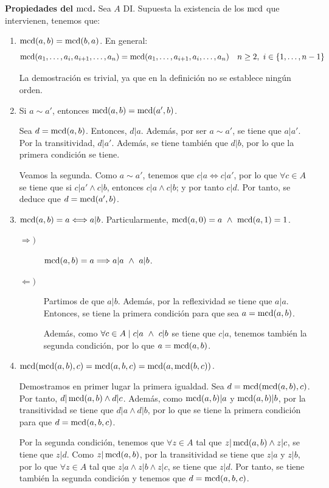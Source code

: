 \textbf{Propiedades del $\operatorname{mcd}$.} Sea $A$ DI. Supuesta la existencia de los $\operatorname{mcd}$ que intervienen, tenemos que:
\begin{enumerate}
    \item $\operatorname{mcd}(a,b) = \operatorname{mcd}(b,a)$.
    En general: $$\operatorname{mcd}(a_1, \ldots, a_i, a_{i+1}, \ldots, a_n) = \operatorname{mcd}(a_1, \ldots, a_{i+1}, a_i, \ldots, a_n)~~~n\geq2,~i \in \{1, \ldots, n-1\}$$

    La demostración es trivial, ya que en la definición no se establece ningún orden.

    \item Si $a\sim a'$, entonces $\operatorname{mcd}(a,b)=\operatorname{mcd}(a',b)$.

    Sea $d = \operatorname{mcd}(a,b)$. Entonces, $d|a$. Además, por ser $a\sim a'$, se tiene que $a|a'$. Por la transitividad, $d|a'$. Además, se tiene también que $d|b$, por lo que la primera condición se tiene.

    Veamos la segunda. Como $a\sim a'$, tenemos que $c|a\Longleftrightarrow c|a'$, por lo que $\forall c\in A$ se tiene que si $c|a'\land c|b$, entonces $c|a\land c|b$; y por tanto $c|d$. Por tanto, se deduce que 
    $d=\operatorname{mcd}(a',b)$.

    \item $\operatorname{mcd}(a,b)=a \Longleftrightarrow a|b$. Particularmente, $\operatorname{mcd}(a,0) = a \ \land \  \operatorname{mcd}(a,1)=1$.
    \begin{description}
        \item[$\Longrightarrow)$] $\operatorname{mcd}(a,b) = a \Longrightarrow a|a \ \land \  a|b$.

        \item[$\Longleftarrow)$] Partimos de que $a|b$. Además, por la reflexividad se tiene que $a|a$. Entonces, se tiene la primera condición para que sea $a=\operatorname{mcd}(a,b)$.

        Además, como $\forall c \in A \mid c|a \ \land \  c|b$ se tiene que $c|a$, tenemos también la segunda condición, por lo que $a=\operatorname{mcd}(a,b)$.
    \end{description}


    \item $\operatorname{mcd}(\operatorname{mcd}(a,b),c) = \operatorname{mcd}(a,b,c) = \operatorname{mcd}(a, \operatorname{mcd}(b,c))$.

    Demostramos en primer lugar la primera igualdad. Sea $d=\operatorname{mcd}(\operatorname{mcd}(a,b),c)$. Por tanto, $d|\operatorname{mcd}(a,b)\land d|c$. Además, como $\operatorname{mcd}(a,b)|a$ y $\operatorname{mcd}(a,b)|b$, por la transitividad se tiene que $d|a\land d|b$, por lo que se tiene la primera condición para que $d=\operatorname{mcd}(a,b,c)$.

    Por la segunda condición, tenemos que $\forall z\in A$ tal que $z|\operatorname{mcd}(a,b)\land z|c$, se tiene que $z|d$. Como $z|\operatorname{mcd}(a,b)$, por la transitividad se tiene que $z|a$ y $z|b$, por lo que $\forall z\in A$ tal que $z|a\land z|b \land z|c$, se tiene que $z|d$. Por tanto, se tiene también la segunda condición y tenemos que $d=\operatorname{mcd}(a,b,c)$.\\


\end{enumerate}

